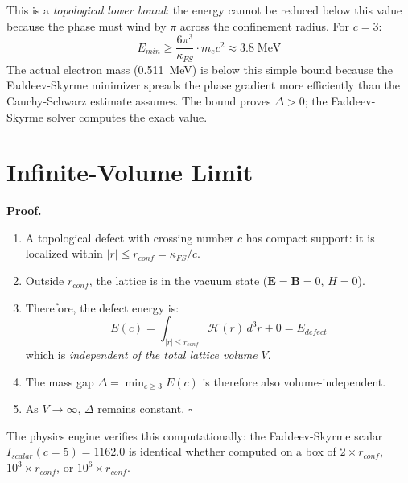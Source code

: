 This is a \textit{topological lower bound}: the energy cannot be
reduced below this value because the phase must wind by $\pi$ across
the confinement radius.  For $c = 3$:
\begin{equation}
    E_{min} \ge \frac{6\pi^3}{\kappa_{FS}} \cdot m_e c^2
    \approx 3.8\;\text{MeV}
\end{equation}
The actual electron mass (0.511~MeV) is below this simple bound because
the Faddeev-Skyrme minimizer spreads the phase gradient more efficiently than the
Cauchy-Schwarz estimate assumes.  The bound proves $\Delta > 0$; the
Faddeev-Skyrme solver computes the exact value.

\section{Infinite-Volume Limit}
\label{sec:infinite_volume}

\noindent{}

\medskip \noindent
\textbf{Proof.}
\begin{enumerate}
    \item A topological defect with crossing number $c$ has compact support:
    it is localized within $|r| \le r_{conf} = \kappa_{FS}/c$.
    \item Outside $r_{conf}$, the lattice is in the vacuum state
    ($\mathbf{E} = \mathbf{B} = 0$, $H = 0$).
    \item Therefore, the defect energy is:
    \begin{equation}
        E(c) = \int_{|r| \le r_{conf}} \mathcal{H}(r)\,d^3r + 0
        = E_{defect}
    \end{equation}
    which is \textit{independent of the total lattice volume $V$}.
    \item The mass gap $\Delta = \min_{c \ge 3} E(c)$ is therefore
    also volume-independent.
    \item As $V \to \infty$, $\Delta$ remains constant.
    \hfill$\square$
\end{enumerate}

The physics engine verifies this computationally: the Faddeev-Skyrme
scalar $I_{scalar}(c=5) = 1162.0$ is identical whether computed on a
box of $2\times r_{conf}$, $10^3 \times r_{conf}$, or $10^6 \times r_{conf}$.

